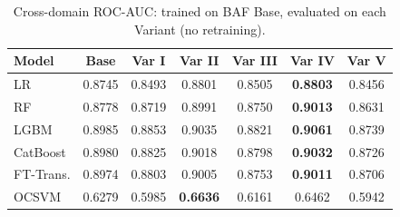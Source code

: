 \begin{table}[ht!]
\centering
\caption{Cross-domain ROC-AUC: trained on BAF Base, evaluated on each Variant (no retraining).}
\label{tab:crossdomain_rocauc}
\begin{tabular}{l c c c c c c}
\toprule
Model & Base & Var I & Var II & Var III & Var IV & Var V \\
\midrule
LR         & 0.8745 & 0.8493 & 0.8801 & 0.8505 & \textbf{0.8803} & 0.8456 \\
RF         & 0.8778 & 0.8719 & 0.8991 & 0.8750 & \textbf{0.9013} & 0.8631 \\
LGBM       & 0.8985 & 0.8853 & 0.9035 & 0.8821 & \textbf{0.9061} & 0.8739 \\
CatBoost   & 0.8980 & 0.8825 & 0.9018 & 0.8798 & \textbf{0.9032} & 0.8726 \\
FT-Trans.  & 0.8974 & 0.8803 & 0.9005 & 0.8753 & \textbf{0.9011} & 0.8706 \\
OCSVM      & 0.6279 & 0.5985 & \textbf{0.6636} & 0.6161 & 0.6462 & 0.5942 \\
\bottomrule
\end{tabular}
\end{table}